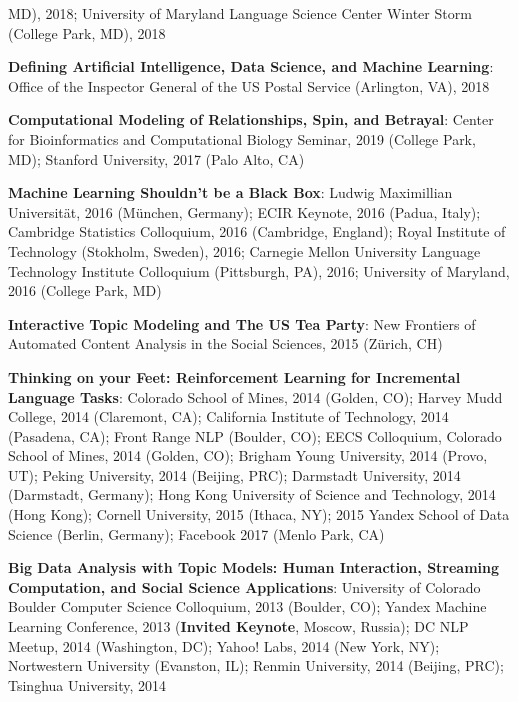 {{\begin{enumerate*}
  MD), 2018;  University of Maryland Language Science Center Winter
  Storm (College Park, MD), 2018
\item {\bf Defining Artificial Intelligence, Data Science, and Machine
    Learning}: Office of the Inspector General of the US Postal
  Service (Arlington, VA), 2018
\item {\bf Computational Modeling of Relationships, Spin, and
    Betrayal}: Center for Bioinformatics and Computational Biology
  Seminar, 2019 (College Park, MD); Stanford University, 2017 (Palo
  Alto, CA)
\item {\bf Machine Learning Shouldn't be a Black Box}: Ludwig
  Maximillian Universit\"at, 2016 (M\"unchen, Germany); ECIR Keynote,
  2016 (Padua, Italy); Cambridge Statistics Colloquium, 2016
  (Cambridge, England); Royal Institute of Technology (Stokholm,
  Sweden), 2016; Carnegie Mellon University Language Technology
    Institute Colloquium (Pittsburgh, PA), 2016; University of
    Maryland, 2016 (College Park, MD)
	\item {\bf Interactive Topic Modeling and The US Tea Party}:
          New Frontiers of Automated Content Analysis in the Social
          Sciences, 2015 (Z\"urich, CH)
	\item {\bf Thinking on your Feet: Reinforcement Learning for Incremental
Language Tasks}: Colorado School of Mines, 2014 (Golden, CO); Harvey
Mudd College, 2014 (Claremont, CA); California Institute of
Technology, 2014 (Pasadena, CA); Front Range NLP (Boulder, CO); EECS
Colloquium, Colorado School of Mines, 2014 (Golden, CO); Brigham Young
University, 2014 (Provo, UT); Peking University, 2014 (Beijing, PRC);
Darmstadt University, 2014 (Darmstadt, Germany); Hong Kong University
of Science and Technology, 2014 (Hong Kong); Cornell University, 2015
(Ithaca, NY); 2015 Yandex School of Data Science (Berlin, Germany);
Facebook 2017 (Menlo Park, CA)
	\item {\bf Big Data Analysis with Topic Models: Human
            Interaction, Streaming Computation, and Social Science
            Applications}: University of Colorado Boulder Computer
          Science Colloquium, 2013 (Boulder, CO); Yandex Machine
          Learning Conference, 2013 ({\bf Invited Keynote}, Moscow,
          Russia); DC NLP Meetup, 2014 (Washington, DC); Yahoo! Labs, 2014 (New
          York, NY); Nortwestern University (Evanston, IL); Renmin
          University, 2014 (Beijing, PRC); Tsinghua University, 2014

\end{enumerate*}}}
